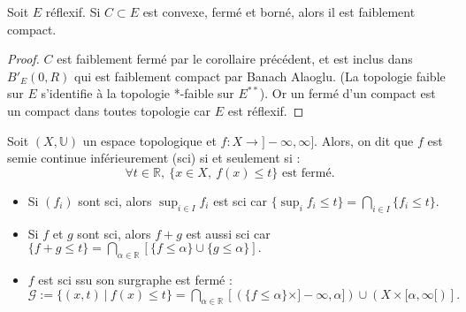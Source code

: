 \begin{corollaire}
    Soit $E$ réflexif. Si $C \subset E$ est convexe, fermé et borné, alors il est faiblement compact.
\end{corollaire}
\begin{proof}
    $C$ est faiblement fermé par le corollaire précédent, et est inclus dans $B'_E(0,R)$ qui est faiblement compact par Banach Alaoglu. (La topologie faible sur $E$ s'identifie à la topologie *-faible sur $E^{**}$). Or un fermé d'un compact est un compact dans toutes topologie car $E$ est réflexif.
\end{proof}
\begin{definition}
    Soit $(X,\mathbb{U})$ un espace topologique et $f:X\to ]-\infty , \infty ].$ Alors, on dit que $f$ est semie continue inférieurement (sci) si et seulement si : $$\forall t\in \mathbb{R} ,\ \{x\in X,~f(x)\le t\} \text{ est fermé.}$$
\end{definition}

\begin{remarque}
\begin{itemize}
    \item Si $(f_i)$ sont sci, alors $\sup_{i\in I}f_i$ est sci car $\{\sup_if_i\le t\} =\bigcap\limits_{i\in I} \{f_i\le t\}$.
    \item Si $f$ et $g$ sont sci, alors $f+g$ est aussi sci car $\{f+g\le t\} =\bigcap\limits_{\alpha \in \mathbb{R} } \left[ \{f\le \alpha \} \cup \{g\le \alpha \}  \right] .$
    \item $f$ est sci ssu son surgraphe est fermé : $\mathcal{G}:=\{(x,t)\ |\ f(x)\le t\} =\bigcap\limits_{\alpha \in \mathbb{R} } \left[ \left( \{f\le \alpha \} \times ]-\infty , \alpha ] \right) \cup \left( X \times [\alpha ,\infty [ \right)  \right] .$
\end{itemize}
\end{remarque}

